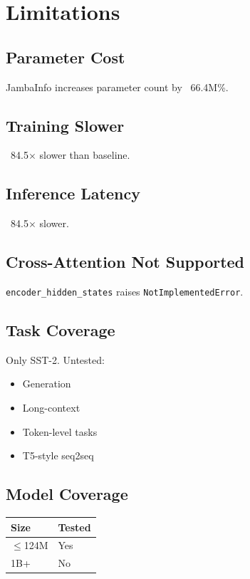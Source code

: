 \section{Limitations}

\subsection{Parameter Cost}

JambaInfo increases parameter count by ~66.4M\%.

\subsection{Training Slower}

~84.5$\times$ slower than baseline.

\subsection{Inference Latency}

~84.5$\times$ slower.

\subsection{Cross-Attention Not Supported}

\texttt{encoder\_hidden\_states} raises \texttt{NotImplementedError}.

\subsection{Task Coverage}

Only SST-2. Untested:
\begin{itemize}
\item Generation
\item Long-context
\item Token-level tasks
\item T5-style seq2seq

\end{itemize}
\subsection{Model Coverage}

\begin{table}[H]
\centering
\small
\begin{tabular}{ll}
\toprule
\textbf{Size} & \textbf{Tested} \\
\midrule
$\le$124M & Yes \\
1B+ & No \\
\bottomrule
\end{tabular}
\end{table}

